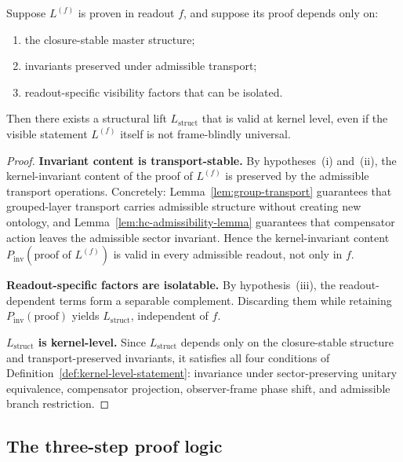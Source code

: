 \begin{proposition}
\label{prop:structural-lift-principle}
Suppose $L^{(f)}$ is proven in readout $f$, and suppose its proof
depends only on:
\begin{enumerate}[label=(\roman*)]
 \item the closure-stable master structure;
 \item invariants preserved under admissible transport;
 \item readout-specific visibility factors that can be isolated.
\end{enumerate}
Then there exists a structural lift $L_{\mathrm{struct}}$ that is valid
at kernel level, even if the visible statement $L^{(f)}$ itself is not
frame-blindly universal.
\end{proposition}

\begin{proof}
\noindent\textbf{Invariant content is transport-stable.}
By hypotheses~(i) and~(ii), the kernel-invariant content of the proof
of $L^{(f)}$ is preserved by the admissible transport operations.
Concretely: Lemma~\ref{lem:group-transport} guarantees that grouped-layer
transport carries admissible structure without creating new ontology, and
Lemma~\ref{lem:hc-admissibility-lemma} guarantees that compensator action
leaves the admissible sector invariant. Hence the kernel-invariant content
$P_{\mathrm{inv}}(\text{proof of }L^{(f)})$ is valid in every admissible
readout, not only in $f$.

\smallskip
\noindent\textbf{Readout-specific factors are isolatable.}
By hypothesis~(iii), the readout-dependent terms form a separable complement.
Discarding them while retaining $P_{\mathrm{inv}}(\text{proof})$ yields
$L_{\mathrm{struct}}$, independent of $f$.

\smallskip
\noindent\textbf{$L_{\mathrm{struct}}$ is kernel-level.}
Since $L_{\mathrm{struct}}$ depends only on the closure-stable structure
and transport-preserved invariants, it satisfies all four conditions of
Definition~\ref{def:kernel-level-statement}: invariance under
sector-preserving unitary equivalence, compensator projection,
observer-frame phase shift, and admissible branch restriction.
\end{proof}

\subsection*{The three-step proof logic}

